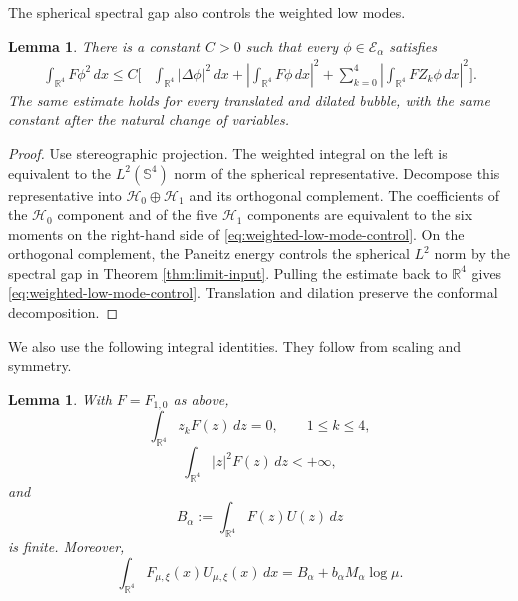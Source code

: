 \documentclass[11pt]{article}
\newtheorem{lemma}[theorem]{Lemma}
\numberwithin{equation}{section}
\begin{document}
The spherical spectral gap also controls the weighted low modes.

\begin{lemma}\label{lem:weighted-low-mode-control}
There is a constant $C>0$ such that every
$\phi\in\mathcal E_\alpha$ satisfies
\begin{equation}\label{eq:weighted-low-mode-control}
\begin{aligned}
\int_{\mathbb R^4}F\phi^2\,dx
\leq C\Bigg[
&\int_{\mathbb R^4}|\Delta\phi|^2\,dx
+\left|\int_{\mathbb R^4}F\phi\,dx\right|^2+\sum_{k=0}^{4}
\left|\int_{\mathbb R^4}FZ_k\phi\,dx\right|^2
\Bigg].
\end{aligned}
\end{equation}
The same estimate holds for every translated and dilated bubble, with
the same constant after the natural change of variables.
\end{lemma}

\begin{proof}
Use stereographic projection.  The weighted integral on the left is
equivalent to the $L^2(\mathbb S^4)$ norm of the spherical
representative.  Decompose this representative into
$\mathcal H_0\oplus\mathcal H_1$ and its orthogonal complement.  The
coefficients of the $\mathcal H_0$ component and of the five
$\mathcal H_1$ components are equivalent to the six moments on the
right-hand side of \eqref{eq:weighted-low-mode-control}.  On the
orthogonal complement, the Paneitz energy controls the spherical
$L^2$ norm by the spectral gap in Theorem
\ref{thm:limit-input}.  Pulling the estimate back to $\mathbb R^4$
gives \eqref{eq:weighted-low-mode-control}.  Translation and
dilation preserve the conformal decomposition.
\end{proof}

We also use the following integral identities. They follow from scaling and symmetry.

\begin{lemma}\label{lem:bubble-integrals}
With $F=F_{1,0}$ as above,
\begin{equation}\label{eq:moment-zero}
\int_{\mathbb R^{4}}z_{k}F(z)\,dz=0,
\qquad 1\leq k\leq4,
\end{equation}
\begin{equation*}
\int_{\mathbb R^{4}}|z|^{2}F(z)\,dz<+\infty,
\end{equation*}
and
\begin{equation*}
B_{\alpha}:=\int_{\mathbb R^{4}}F(z)U(z)\,dz
\end{equation*}
 is finite. Moreover,
\begin{equation}\label{eq:self-energy-scaling}
\int_{\mathbb R^{4}}F_{\mu,\xi}(x)U_{\mu,\xi}(x)\,dx
=B_{\alpha}+b_{\alpha}M_{\alpha}\log\mu.
\end{equation}
\end{lemma}
\end{document}
